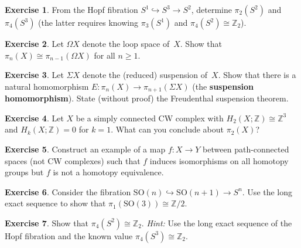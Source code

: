 \documentclass[12pt,a4paper,openany]{book}
\theoremstyle{definition}
\newtheorem{exercise}{Exercise}[chapter]
\theoremstyle{plain}
\theoremstyle{remark}
\newcommand{\Z}{\mathbb{Z}}
\begin{document}
\begin{exercise}
From the Hopf fibration $S^1\hookrightarrow S^3\to S^2$, determine
$\pi_2(S^2)$ and $\pi_4(S^3)$ (the latter requires knowing
$\pi_3(S^1)$ and $\pi_4(S^2)\cong\Z_2$).
\end{exercise}

\begin{exercise}
Let $\Omega X$ denote the loop space of~$X$.  Show that
$\pi_n(X)\cong\pi_{n-1}(\Omega X)$ for all $n\ge1$.
\end{exercise}

\begin{exercise}
Let $\Sigma X$ denote the (reduced) suspension of~$X$.  Show that
there is a natural homomorphism
$E\colon\pi_n(X)\to\pi_{n+1}(\Sigma X)$ (the \textbf{suspension
homomorphism}).  State (without
proof) the Freudenthal suspension theorem.
\end{exercise}

\begin{exercise}
Let $X$ be a simply connected CW complex with $H_2(X;\Z)\cong\Z^3$
and $H_k(X;\Z)=0$ for $k=1$.  What can you conclude about $\pi_2(X)$?
\end{exercise}

\begin{exercise}
Construct an example of a map $f\colon X\to Y$ between
path-connected spaces (not CW complexes) such that $f$ induces
isomorphisms on all homotopy groups but $f$ is not a homotopy
equivalence.
\end{exercise}

\begin{exercise}
Consider the fibration $\mathrm{SO}(n)\hookrightarrow
\mathrm{SO}(n+1)\to S^n$.  Use the long exact sequence to show that
$\pi_1(\mathrm{SO}(3))\cong\Z/2$.
\end{exercise}

\begin{exercise}
Show that $\pi_4(S^2)\cong\Z_2$.
\textit{Hint:} Use the long exact sequence of the Hopf fibration and
the known value $\pi_4(S^3)\cong\Z_2$.
\end{exercise}


\end{document}
